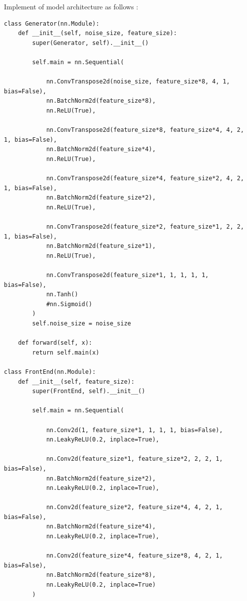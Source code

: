 \documentclass[12pt]{article}
\begin{document}
Implement of model architecture as follows :

\begin{verbatim}
class Generator(nn.Module):
    def __init__(self, noise_size, feature_size):
        super(Generator, self).__init__()
        
        self.main = nn.Sequential(
            
            nn.ConvTranspose2d(noise_size, feature_size*8, 4, 1, bias=False),
            nn.BatchNorm2d(feature_size*8),
            nn.ReLU(True),
            
            nn.ConvTranspose2d(feature_size*8, feature_size*4, 4, 2, 1, bias=False),
            nn.BatchNorm2d(feature_size*4),
            nn.ReLU(True),
            
            nn.ConvTranspose2d(feature_size*4, feature_size*2, 4, 2, 1, bias=False),
            nn.BatchNorm2d(feature_size*2),
            nn.ReLU(True),
            
            nn.ConvTranspose2d(feature_size*2, feature_size*1, 2, 2, 1, bias=False),
            nn.BatchNorm2d(feature_size*1),
            nn.ReLU(True),
            
            nn.ConvTranspose2d(feature_size*1, 1, 1, 1, 1, bias=False),
            nn.Tanh()
            #nn.Sigmoid()
        )
        self.noise_size = noise_size
        
    def forward(self, x):
        return self.main(x)
    
class FrontEnd(nn.Module):
    def __init__(self, feature_size):
        super(FrontEnd, self).__init__()
        
        self.main = nn.Sequential(
            
            nn.Conv2d(1, feature_size*1, 1, 1, 1, bias=False),
            nn.LeakyReLU(0.2, inplace=True),
            
            nn.Conv2d(feature_size*1, feature_size*2, 2, 2, 1, bias=False),
            nn.BatchNorm2d(feature_size*2),
            nn.LeakyReLU(0.2, inplace=True),
            
            nn.Conv2d(feature_size*2, feature_size*4, 4, 2, 1, bias=False),
            nn.BatchNorm2d(feature_size*4),
            nn.LeakyReLU(0.2, inplace=True),
            
            nn.Conv2d(feature_size*4, feature_size*8, 4, 2, 1, bias=False),
            nn.BatchNorm2d(feature_size*8),
            nn.LeakyReLU(0.2, inplace=True)
        )
    

\end{verbatim}
\end{document}

